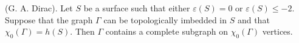 (G. A. Dirac). Let $S$ be a surface such that either $\varepsilon(S) = 0$ or $\varepsilon(S) \leq -2$. Suppose that the graph $\Gamma$ can be topologically imbedded in $S$ and that $\chi_0(\Gamma) = h(S)$. Then $\Gamma$ contains a complete subgraph on $\chi_0(\Gamma)$ vertices.
